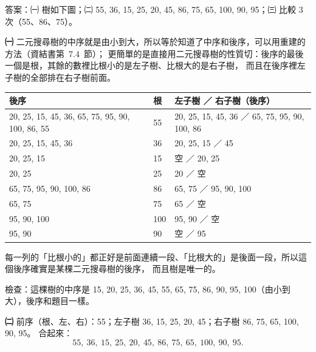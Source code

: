 \begin{pastsoln}
答案：㈠ 樹如下圖；㈡ 55, 36, 15, 25, 20, 45, 86, 75, 65, 100, 90, 95；㈢ 比較 $3$ 次（55、86、75）。

\textbf{㈠} 二元搜尋樹的中序就是由小到大，所以等於知道了中序和後序，可以用重建的方法（資結書第~7.4~節）；
更簡單的是直接用二元搜尋樹的性質切：後序的最後一個是根，其餘的數裡比根小的是左子樹、比根大的是右子樹，
而且在後序裡左子樹的全部排在右子樹前面。
\begin{center}
\small
\begin{tabular}{lll}
\toprule
後序 & 根 & 左子樹 ／ 右子樹（後序） \\
\midrule
20, 25, 15, 45, 36, 65, 75, 95, 90, 100, 86, 55 & 55 & 20, 25, 15, 45, 36 ／ 65, 75, 95, 90, 100, 86 \\
20, 25, 15, 45, 36 & 36 & 20, 25, 15 ／ 45 \\
20, 25, 15 & 15 & 空 ／ 20, 25 \\
20, 25 & 25 & 20 ／ 空 \\
65, 75, 95, 90, 100, 86 & 86 & 65, 75 ／ 95, 90, 100 \\
65, 75 & 75 & 65 ／ 空 \\
95, 90, 100 & 100 & 95, 90 ／ 空 \\
95, 90 & 90 & 空 ／ 95 \\
\bottomrule
\end{tabular}
\end{center}
每一列的「比根小的」都正好是前面連續一段、「比根大的」是後面一段，所以這個後序確實是某棵二元搜尋樹的後序，
而且樹是唯一的。
\begin{center}
\end{center}
檢查：這棵樹的中序是 15, 20, 25, 36, 45, 55, 65, 75, 86, 90, 95, 100（由小到大），後序和題目一樣。

\textbf{㈡} 前序（根、左、右）：55；左子樹 36, 15, 25, 20, 45；右子樹 86, 75, 65, 100, 90, 95。 合起來：
\[
55,\ 36,\ 15,\ 25,\ 20,\ 45,\ 86,\ 75,\ 65,\ 100,\ 90,\ 95.
\]


\end{pastsoln}

